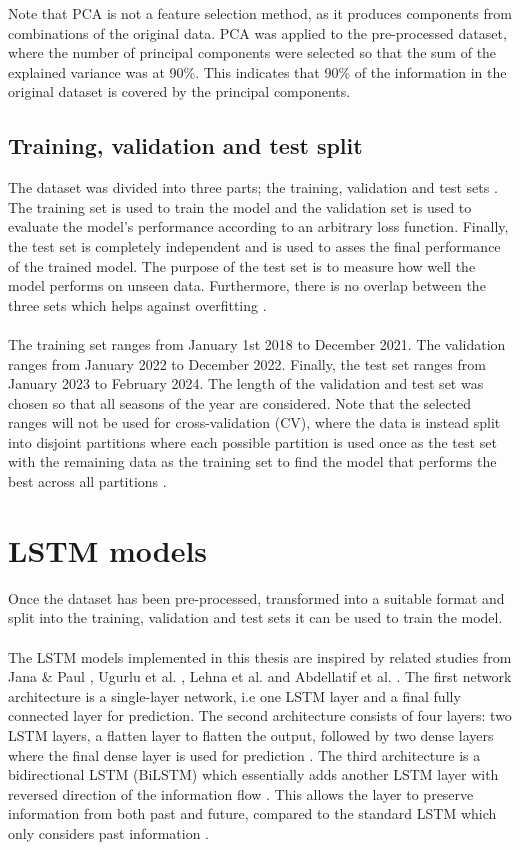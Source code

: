 Note that PCA is not a feature selection method, as it produces components from combinations of the original data. PCA was applied to the pre-processed dataset, where the number of principal components were selected so that the sum of the explained variance was at 90\%. This indicates that 90\% of the information in the original dataset is covered by the principal components.  

\subsection{Training, validation and test split}
The dataset was divided into three parts; the training, validation and test sets \cite{goodfellow}. The training set is used to train the model and the validation set is used to evaluate the model's performance according to an arbitrary loss function. Finally, the test set is completely independent and is used to asses the final performance of the trained model. The purpose of the test set is to measure how well the model performs on unseen data. Furthermore, there is no overlap between the three sets which helps against overfitting \cite{nielsen}. 
\\\\
The training set ranges from January 1st 2018 to December 2021. The validation ranges from January 2022 to December 2022. Finally, the test set ranges from January 2023 to February 2024. The length of the validation and test set was chosen so that all seasons of the year are considered. Note that the selected ranges will not be used for cross-validation (CV), where the data is instead split into disjoint partitions where each possible partition is used once as the test set with the remaining data as the training set to find the model that performs the best across all partitions \cite{LAGO2021116983}. 

\section{LSTM models}
Once the dataset has been pre-processed, transformed into a suitable format and split into the training, validation and test sets it can be used to train the model. 
\\\\
The LSTM models implemented in this thesis are inspired by related studies from Jana \& Paul \cite{stackedlstm}, Ugurlu et al. \cite{architechture1}, Lehna et al. \cite{arch2} and Abdellatif et al. \cite{bilstm}. The first network architecture is a single-layer network, i.e one LSTM layer and a final fully connected layer for prediction. The second architecture consists of four layers: two LSTM layers, a flatten layer to flatten the output, followed by two dense layers where the final dense layer is used for prediction \cite{stackedlstm, arch2}. The third architecture is a bidirectional LSTM (BiLSTM) \cite{bilstm} which essentially adds another LSTM layer with reversed direction of the information flow \cite{diveLSTM}. This allows the layer to preserve information from both past and future, compared to the standard LSTM which only considers past information \cite{diveLSTM}. 

